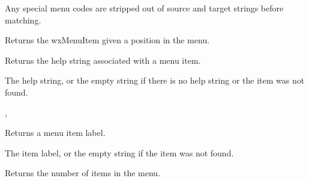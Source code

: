 
Any special menu codes are stripped out of source and target strings
before matching.


\label{wxmenufinditembyposition}


Returns the wxMenuItem given a position in the menu.

\label{wxmenugethelpstring}


Returns the help string associated with a menu item.




The help string, or the empty string if there is no help string or the
item was not found.


, 

\label{wxmenugetlabel}


Returns a menu item label.




The item label, or the empty string if the item was not found.



\label{wxmenugetmenuitemcount}


Returns the number of items in the menu.

\label{wxmenugetmenuitems}

